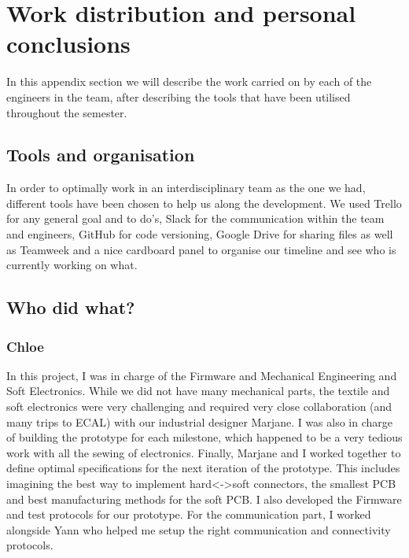 \newpage
\section{Work distribution and personal conclusions}
\label{appendix:work_distribution}


In this appendix section we will describe the work carried on by each of the engineers in the team, after describing the tools that have been utilised throughout the semester.

\subsection{Tools and organisation}
In order to optimally work in an interdisciplinary team as the one we had, different tools have been chosen to help us along the development. We used Trello for any general goal and to do's, Slack for the communication within the team and engineers, GitHub for code versioning, Google Drive for sharing files as well as Teamweek and a nice cardboard panel to organise our timeline and see who is currently working on what.

\subsection{Who did what?}

\subsubsection{Chloe}
In this project, I was in charge of the Firmware and Mechanical Engineering and Soft Electronics. While we did not have many mechanical parts, the textile and soft electronics were very challenging and required very close collaboration (and many trips to ECAL) with our industrial designer Marjane. I was also in charge of building the prototype for each milestone, which happened to be a very tedious work with all the sewing of electronics. Finally, Marjane and I worked together to define optimal specifications for the next iteration of the prototype. This includes imagining the best way to implement hard<->soft connectors, the smallest PCB and best manufacturing methods for the soft PCB. I also developed the Firmware and test protocols for our prototype. For the communication part, I worked alongside Yann who helped me setup the right communication and connectivity protocols. 


